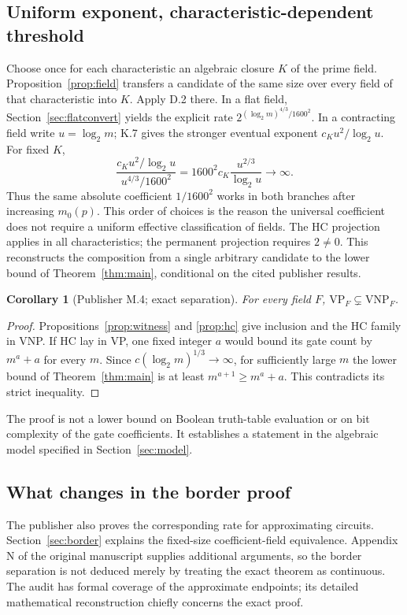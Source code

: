 \documentclass[11pt,letterpaper]{article}
\newtheorem{corollary}[theorem]{Corollary}
\theoremstyle{definition}\newtheorem{definition}[theorem]{Definition}\newtheorem{example}[theorem]{Example}
\theoremstyle{remark}\newtheorem{remark}[theorem]{Remark}
\newcommand{\VP}{\mathrm{VP}}
\newcommand{\VNP}{\mathrm{VNP}}
\begin{document}
\subsection{Uniform exponent, characteristic-dependent threshold}
Choose once for each characteristic an algebraic closure $K$ of the prime field. Proposition~\ref{prop:field} transfers a candidate of the same size over every field of that characteristic into $K$. Apply D.2 there. In a flat field, Section~\ref{sec:flatconvert} yields the explicit rate $2^{(\log_2m)^{4/3}/1600^2}$. In a contracting field write $u=\log_2m$; K.7 gives the stronger eventual exponent $c_K u^2/\log_2u$. For fixed $K$,
\[
 \frac{c_Ku^2/\log_2u}{u^{4/3}/1600^2}
 =1600^2c_K\frac{u^{2/3}}{\log_2u}\longrightarrow\infty.
\]
Thus the same absolute coefficient $1/1600^2$ works in both branches after increasing $m_0(p)$. This order of choices is the reason the universal coefficient does not require a uniform effective classification of fields. The HC projection applies in all characteristics; the permanent projection requires $2\ne0$. This reconstructs the composition from a single arbitrary candidate to the lower bound of Theorem~\ref{thm:main}, conditional on the cited publisher results.

\begin{corollary}[Publisher M.4; exact separation]
For every field $F$, $\VP_F\subsetneq\VNP_F$.
\end{corollary}
\begin{proof}
Propositions~\ref{prop:witness} and \ref{prop:hc} give inclusion and the HC family in VNP. If HC lay in VP, one fixed integer $a$ would bound its gate count by $m^a+a$ for every $m$. Since $c(\log_2m)^{1/3}\to\infty$, for sufficiently large $m$ the lower bound of Theorem~\ref{thm:main} is at least $m^{a+1}\ge m^a+a$. This contradicts its strict inequality.
\end{proof}
The proof is not a lower bound on Boolean truth-table evaluation or on bit complexity of the gate coefficients. It establishes a statement in the algebraic model specified in Section~\ref{sec:model}.

\subsection{What changes in the border proof}\label{sec:approx}
The publisher also proves the corresponding rate for approximating circuits. Section~\ref{sec:border} explains the fixed-size coefficient-field equivalence. Appendix N of the original manuscript supplies additional arguments, so the border separation is not deduced merely by treating the exact theorem as continuous. The audit has formal coverage of the approximate endpoints; its detailed mathematical reconstruction chiefly concerns the exact proof.
\end{document}
